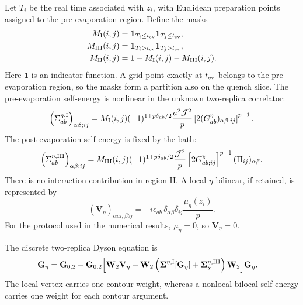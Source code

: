 \documentclass[11pt,a4paper]{article}
\begin{document}
Let \(T_i\) be the real time associated with \(z_i\), with Euclidean
preparation points assigned to the pre-evaporation region. Define the masks
\begin{equation}
\begin{aligned}
  M_{\rm I}(i,j)
  &=
  \mathbf 1_{T_i\leq t_{\rm ev}}
  \mathbf 1_{T_j\leq t_{\rm ev}},
  \\
  M_{\rm III}(i,j)
  &=
  \mathbf 1_{T_i>t_{\rm ev}}
  \mathbf 1_{T_j>t_{\rm ev}},
  \\
  M_{\rm II}(i,j)
  &=
  1-M_{\rm I}(i,j)-M_{\rm III}(i,j).
\end{aligned}
\label{eq:S5-region-masks}
\end{equation}
Here \(\mathbf 1\) is an indicator function. A grid point exactly at
\(t_{\rm ev}\) belongs to the pre-evaporation region, so the masks form a
partition also on the quench slice.
The pre-evaporation self-energy is nonlinear in the unknown two-replica
correlator:
\begin{equation}
  \left(
  \Sigma^{\eta,\rm I}_{ab}
  \right)_{\alpha\beta;ij}
  =
  M_{\rm I}(i,j)
  (-1)^{1+p\delta_{ab}/2}
  \frac{a^2\mathcal J^2}{p}
  \left[
  2(G^\eta_{ab})_{\alpha\beta;ij}
  \right]^{p-1}.
\label{eq:S5-discrete-sigma-I}
\end{equation}
The post-evaporation self-energy is fixed by the bath:
\begin{equation}
  \left(
  \Sigma^{\eta,\rm III}_{ab}
  \right)_{\alpha\beta;ij}
  =
  M_{\rm III}(i,j)
  (-1)^{1+p\delta_{ab}/2}
  \frac{\mathcal J^2}{p}
  \left[
  2G^\chi_{ab;ij}
  \right]^{p-1}
  (\Pi_{ij})_{\alpha\beta}.
\label{eq:S5-discrete-sigma-III}
\end{equation}
There is no interaction contribution in region II. A local \(\eta\)
bilinear, if retained, is represented by
\begin{equation}
  (\mathbf V_\eta)_{\alpha a i,\beta b j}
  =
  -i\epsilon_{ab}\,
  \delta_{\alpha\beta}\delta_{ij}
  \frac{\mu_\eta(z_i)}{p}.
\label{eq:S5-discrete-bilinear}
\end{equation}
For the protocol used in the numerical results,
\(\mu_\eta=0\), so \(\mathbf V_\eta=0\).

The discrete two-replica Dyson equation is
\begin{equation}
\begin{aligned}
  \mathbf G_\eta
  &=
  \mathbf G_{0,2}
  +
  \mathbf G_{0,2}
  \Big[
  \mathbf W_2\mathbf V_\eta
  +
  \mathbf W_2
  \left(
  \boldsymbol\Sigma^{\eta,\rm I}[\mathbf G_\eta]
  +
  \boldsymbol\Sigma^{\eta,\rm III}_{\chi}
  \right)
  \mathbf W_2
  \Big]
  \mathbf G_\eta .
\end{aligned}
\label{eq:S5-discrete-Dyson}
\end{equation}
The local vertex carries one contour weight, whereas a nonlocal bilocal
self-energy carries one weight for each contour argument.
\end{document}
